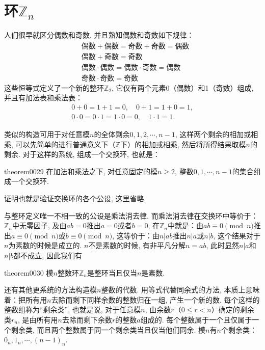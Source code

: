 \section{环$\mathbb{Z}_n$}\label{section0010110}
人们很早就区分偶数和奇数, 并且熟知偶数和奇数如下规律：
\[
\begin{aligned}
&\text{偶数}+\text{偶数} = \text{奇数} + \text{奇数} = \text{偶数}\\
&\text{偶数}+\text{奇数} = \text{奇数}\\
&\text{偶数}\cdot\text{偶数} = \text{偶数}\cdot\text{奇数} = \text{偶数}\\
&\text{奇数} \cdot \text{奇数} = \text{奇数}
\end{aligned}
\]
这些恒等式定义了一个新的整环$\mathbb{Z}_2$, 它仅有两个元素0（偶数）和1（奇数）组成, 并且有加法表和乘法表：
\begin{gather*}
0+0=1+1=0, \quad 0+1=1+0=1,\\
0 \cdot 0=0 \cdot 1= 1 \cdot 0 =0,\quad 1 \cdot 1 = 1.
\end{gather*}

类似的构造可用于对任意模$n$的全体剩余$0,1,2,\cdots,n-1$, 这样两个剩余的相加或相乘, 可以先简单的进行普通意义下（$\mathbb{Z}$下）的相加或相乘, 然后将所得结果取模$n$的剩余. 对于这样的系统, 组成一个交换环, 也就是：
\begin{theorem}{}{theorem0029}
在加法和乘法之下, 对任意固定的模$n \ge 2$, 整数$0, 1, \cdots, n-1$的集合组成一个交换环. 
\end{theorem}

证明也就是验证交换环的各个公设, 这里省略. 

与整环定义唯一不相一致的公设是乘法消去律. 而乘法消去律在交换环中等价于：$\mathbb{Z}_n$中无零因子, 及由$ab=0$推出$a=0$或者$b=0$, 在$\mathbb{Z}_n$中就是：由$ab \equiv 0 \pmod{n}$推出$a \equiv 0 \pmod{n}$或$b \equiv 0 \pmod{n}$, 这等价于：由$n|ab$推出$n|a$或$n|b$, 这个结果对于$n$为素数的时候是成立的. $n$不是素数的时候, 有非平凡分解$n=ab$, 此时显然$n|a$和$n|b$都不成立, 因此我们有
\begin{theorem}{}{theorem0030}
模$n$整数环$\mathbb{Z}_n$是整环当且仅当$n$是素数. 
\end{theorem}

还有其他更系统的方法构造模$n$整数的代数. 用等式代替同余式的方法, 本质上意味着：把所有用$n$去除而剩下同样余数的整数归在一组, 产生一个新的数. 每个这样的整数组称为“剩余类”, 也就是说, 对于任意模$n$, 由余数$r$（$0 \le r < n$）确定的剩余类$r_n$, 是由所有用$n$去除而剩下余数$r$的整数$a$组成的. 每个整数属于一个且仅属于一个剩余类, 而且两个整数属于同一个剩余类当且仅当他们同余. 模$n$有$n$个剩余类：$0_n,1_n,\cdots,(n-1)_n$. 

